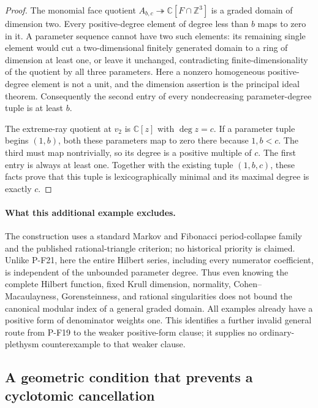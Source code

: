 \documentclass[11pt,a4paper]{article}
\begin{document}
\begin{proof}
The monomial face quotient $A_{b,c}\twoheadrightarrow
\mathbb C[F\cap\mathbb Z^3]$ is a graded domain of dimension
two. Every positive-degree element of degree less than $b$ maps
to zero in it. A parameter sequence cannot have two such
elements: its remaining single element would cut a
two-dimensional finitely generated domain to a ring of
dimension at least one, or leave it unchanged, contradicting
finite-dimensionality of the quotient by all three parameters.
Here a nonzero homogeneous positive-degree element is not a
unit, and the dimension assertion is the principal ideal theorem.
Consequently the second entry of every nondecreasing
parameter-degree tuple is at least $b$.

The extreme-ray quotient at $v_2$ is $\mathbb C[z]$ with
$\deg z=c$. If a parameter tuple begins $(1,b)$, both these
parameters map to zero there because $1,b<c$. The third must
map nontrivially, so its degree is a positive multiple of $c$.
The first entry is always at least one. Together with the
existing tuple $(1,b,c)$, these facts prove that this tuple is
lexicographically minimal and its maximal degree is exactly $c$.
\end{proof}

\paragraph{What this additional example excludes.}
The construction uses a standard Markov and Fibonacci period-collapse
family and the published rational-triangle criterion; no historical
priority is claimed. Unlike P-F21, here the entire Hilbert series,
including every numerator coefficient, is independent of the
unbounded parameter degree. Thus even knowing the complete
Hilbert function, fixed Krull dimension, normality,
Cohen--Macaulayness, Gorensteinness, and rational singularities
does not bound the canonical modular index of a general graded
domain. All examples already have a positive form of denominator
weights one. This identifies a further invalid general route
from P-F19 to the weaker positive-form clause; it supplies no
ordinary-plethysm counterexample to that weaker clause.


\subsection{A geometric condition that prevents a cyclotomic cancellation}
\end{document}
